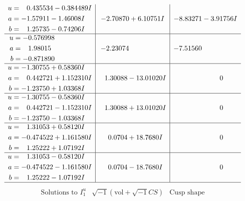 \documentclass[1p]{elsarticle_modified}
\theoremstyle{definition}
\newcommand{\I}{\sqrt{-1}}
\begin{document}
$$\begin{array}{c|c|c}
\begin{aligned}
u &= \phantom{-}0.435534 - 0.384489 I \\
a &= -1.57911 - 1.46008 I \\
b &= \phantom{-}1.25735 - 0.74206 I\end{aligned}
 & -2.70870 + 6.10751 I & -8.83271 - 3.91756 I \\ \hline\begin{aligned}
u &= -0.576998\phantom{ +0.000000I} \\
a &= \phantom{-}1.98015\phantom{ +0.000000I} \\
b &= -0.871890\phantom{ +0.000000I}\end{aligned}
 & -2.23074\phantom{ +0.000000I} & -7.51560\phantom{ +0.000000I} \\ \hline\begin{aligned}
u &= -1.30755 + 0.58360 I \\
a &= \phantom{-}0.442721 + 1.152310 I \\
b &= -1.23750 + 1.03368 I\end{aligned}
 & \phantom{-}1.30088 - 13.01020 I & \phantom{-0.000000 } 0 \\ \hline\begin{aligned}
u &= -1.30755 - 0.58360 I \\
a &= \phantom{-}0.442721 - 1.152310 I \\
b &= -1.23750 - 1.03368 I\end{aligned}
 & \phantom{-}1.30088 + 13.01020 I & \phantom{-0.000000 } 0 \\ \hline\begin{aligned}
u &= \phantom{-}1.31053 + 0.58120 I \\
a &= -0.474522 + 1.161580 I \\
b &= \phantom{-}1.25222 + 1.07192 I\end{aligned}
 & \phantom{-}0.0704 + 18.7680 I & \phantom{-0.000000 } 0 \\ \hline\begin{aligned}
u &= \phantom{-}1.31053 - 0.58120 I \\
a &= -0.474522 - 1.161580 I \\
b &= \phantom{-}1.25222 - 1.07192 I\end{aligned}
 & \phantom{-}0.0704 - 18.7680 I & \phantom{-0.000000 } 0\\
 \hline 
 \end{array}$$\newpage$$\begin{array}{c|c|c}  
\text{Solutions to }I^u_{1}& \I (\text{vol} + \sqrt{-1}CS) & \text{Cusp shape}\\

\end{array}$$
\end{document}
